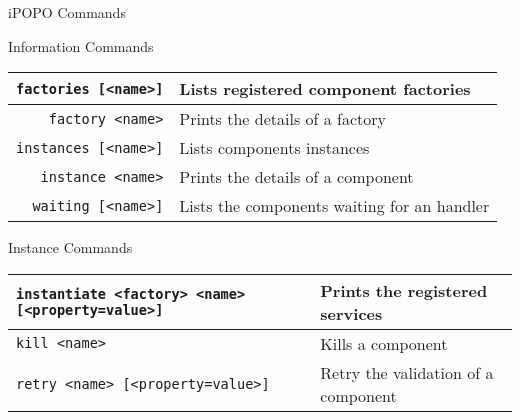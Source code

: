 \begin{frame}{iPOPO Commands}
\begin{block}{Information Commands}
\centering
\begin{small}
\begin{tabular}{r l}
\texttt{\scriptsize factories [<name>]} & Lists registered component factories \\
\hline
\texttt{\scriptsize factory <name>} & Prints the details of a factory \\
\hline
\texttt{\scriptsize instances [<name>]} & Lists components instances \\
\hline
\texttt{\scriptsize instance <name>} & Prints the details of a component \\
\hline
\texttt{\scriptsize waiting [<name>]} & Lists the components waiting for an handler \\
\end{tabular}
\end{small}
\end{block}

\begin{block}{Instance Commands}
\centering
\begin{footnotesize}
\begin{tabular}{p{} l}
\texttt{\scriptsize instantiate <factory> <name> [<property=value>]} & Prints the registered services \\
\hline
\texttt{\scriptsize kill <name>} & Kills a component \\
\hline
\texttt{\scriptsize retry <name> [<property=value>]} & Retry the validation of a component \\
\end{tabular}
\end{footnotesize}
\end{block}
\end{frame}

